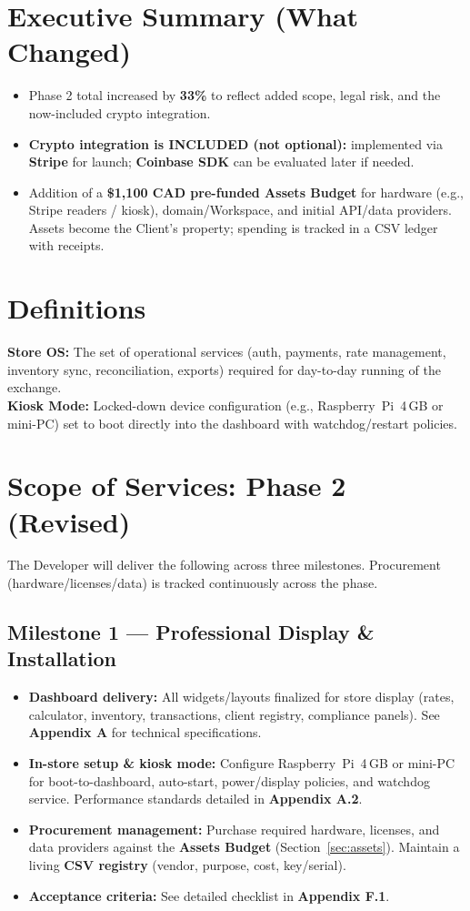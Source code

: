 \documentclass[11pt, a4paper]{article}
\begin{document}
\section*{Executive Summary (What Changed)}
\begin{itemize}[leftmargin=*]
  \item Phase 2 total increased by \textbf{33\%} to reflect added scope, legal risk, and the now-included crypto integration.
  \item \textbf{Crypto integration is INCLUDED (not optional):} implemented via \textbf{Stripe} for launch; \textbf{Coinbase SDK} can be evaluated later if needed.
  \item Addition of a \textbf{\$1,100 CAD pre-funded Assets Budget} for hardware (e.g., Stripe readers / kiosk), domain/Workspace, and initial API/data providers. Assets become the Client’s property; spending is tracked in a CSV ledger with receipts.
\end{itemize}

\section*{Definitions}
\textbf{Store OS:} The set of operational services (auth, payments, rate management, inventory sync, reconciliation, exports) required for day-to-day running of the exchange. \\
\textbf{Kiosk Mode:} Locked-down device configuration (e.g., Raspberry~Pi~4\,GB or mini-PC) set to boot directly into the dashboard with watchdog/restart policies.

\section{Scope of Services: Phase 2 (Revised)}
The Developer will deliver the following across three milestones. Procurement (hardware/licenses/data) is tracked continuously across the phase.

\subsection{Milestone 1 — Professional Display \& Installation}
\begin{itemize}[leftmargin=*]
  \item \textbf{Dashboard delivery:} All widgets/layouts finalized for store display (rates, calculator, inventory, transactions, client registry, compliance panels). See \textbf{Appendix A} for technical specifications.
  \item \textbf{In-store setup \& kiosk mode:} Configure Raspberry~Pi~4\,GB or mini-PC for boot-to-dashboard, auto-start, power/display policies, and watchdog service. Performance standards detailed in \textbf{Appendix A.2}.
  \item \textbf{Procurement management:} Purchase required hardware, licenses, and data providers against the \textbf{Assets Budget} (Section~\ref{sec:assets}). Maintain a living \textbf{CSV registry} (vendor, purpose, cost, key/serial).
  \item \textbf{Acceptance criteria:} See detailed checklist in \textbf{Appendix F.1}.
\end{itemize}
\end{document}
